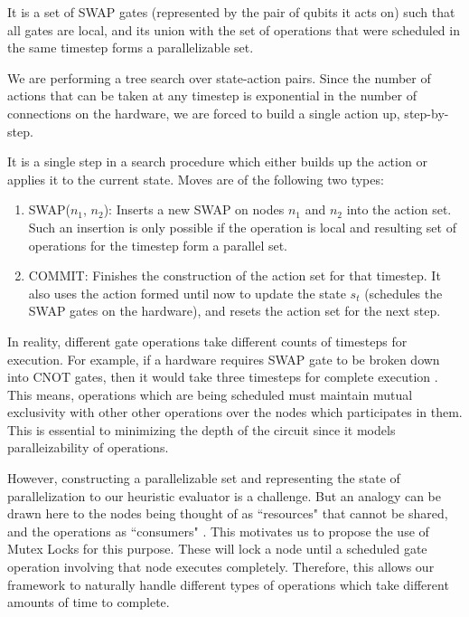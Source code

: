 \documentclass[%
 reprint,
amsmath,amssymb,showkeys,
pra,
]{revtex4-2}
\begin{document}
\begin{defn}[Action]
    It is a set of SWAP gates (represented by the pair of qubits it acts on) such that all gates are local, and its union with the set of operations that were scheduled in the same timestep forms a parallelizable set.
\end{defn}

We are performing a tree search over state-action pairs. Since the number of actions that can be taken at any timestep is exponential in the number of connections on the hardware, we are forced to build a single action up, step-by-step. 

\begin{defn}[Move]
    It is a single step in a search procedure which either builds up the action or applies it to the current state. Moves are of the following two types:
    \begin{enumerate}
        \item SWAP($n_1$, $n_2$): Inserts a new SWAP on nodes $n_1$ and $n_2$ into the action set. Such an insertion is only possible if the operation is local and resulting set of operations for the timestep form a parallel set.
        \item COMMIT: Finishes the construction of the action set for that timestep. It also uses the action formed until now to update the state $s_t$ (schedules the SWAP gates on the hardware), and resets the action set for the next step.
    \end{enumerate}
\end{defn}

In reality, different gate operations take different counts of timesteps for execution. For example, if a hardware requires SWAP gate to be broken down into CNOT gates, then it would take three timesteps for complete execution \citep{utk_equiv_circuits}. This means, operations which are being scheduled must maintain mutual exclusivity with other other operations over the nodes which participates in them. This is essential to minimizing the depth of the circuit since it models paralleizability of operations.

However, constructing a parallelizable set and representing the state of parallelization to our heuristic evaluator is a challenge. But an analogy can be drawn here to the nodes being thought of as ``resources" that cannot be shared, and the operations as ``consumers" \citep{mutex_dijkstra}. This motivates us to propose the use of Mutex Locks for this purpose. These will lock a node until a scheduled gate operation involving that node executes completely. Therefore, this allows our framework to naturally handle different types of operations which take different amounts of time to complete.
\end{document}
